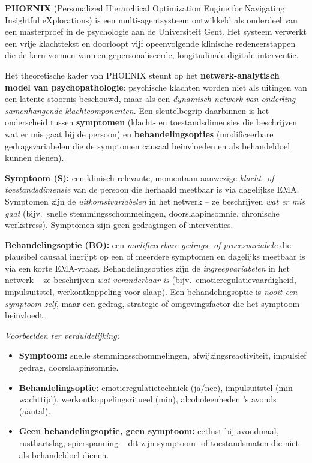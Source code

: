 \documentclass[11pt,a4paper]{article}
\begin{document}
\textbf{PHOENIX} (Personalized Hierarchical Optimization Engine for Navigating
Insightful eXplorations) is een multi-agentsysteem ontwikkeld als onderdeel van
een masterproef in de psychologie aan de Universiteit Gent. Het systeem verwerkt
een vrije klachttekst en doorloopt vijf opeenvolgende klinische redeneerstappen
die de kern vormen van een gepersonaliseerde, longitudinale digitale interventie.

Het theoretische kader van PHOENIX steunt op het \textbf{netwerk-analytisch model
van psychopathologie}: psychische klachten worden niet
als uitingen van een latente stoornis beschouwd, maar als een \emph{dynamisch
netwerk van onderling samenhangende klachtcomponenten}. Een sleutelbegrip daarbinnen
is het onderscheid tussen \textbf{symptomen} (klacht- en toestandsdimensies die
beschrijven wat er mis gaat bij de persoon) en \textbf{behandelingsopties}
(modificeerbare gedragsvariabelen die de symptomen causaal beinvloeden en als
behandeldoel kunnen dienen).

\vspace{0.4em}
\begin{instrbox}[title={Kerndefinities: symptoom versus behandelingsoptie}]
\small
\textbf{Symptoom (S):} een klinisch relevante, momentaan aanwezige
\emph{klacht- of toestandsdimensie} van de persoon die herhaald meetbaar is via
dagelijkse EMA. Symptomen zijn de \emph{uitkomstvariabelen} in het netwerk -- ze
beschrijven \emph{wat er mis gaat} (bijv.\ snelle stemmingsschommelingen, doorslaapinsomnie,
chronische werkstress). Symptomen zijn geen gedragingen of interventies.

\medskip
\textbf{Behandelingsoptie (BO):} een \emph{modificeerbare gedrags- of procesvariabele}
die plausibel causaal ingrijpt op een of meerdere symptomen en dagelijks meetbaar
is via een korte EMA-vraag. Behandelingsopties zijn de \emph{ingreepvariabelen} in het
netwerk -- ze beschrijven \emph{wat veranderbaar is} (bijv.\ emotieregulatievaardigheid,
impulsuitstel, werkontkoppeling voor slaap). Een behandelingsoptie is \emph{nooit een symptoom zelf},
maar een gedrag, strategie of omgevingsfactor die het symptoom beinvloedt.

\medskip\small
\textit{Voorbeelden ter verduidelijking:}
\begin{itemize}[topsep=1pt,itemsep=0pt]
\item \textbf{Symptoom:} snelle stemmingsschommelingen, afwijzingsreactiviteit, impulsief gedrag, doorslaapinsomnie.
\item \textbf{Behandelingsoptie:} emotieregulatietechniek (ja/nee), impulsuitstel (min wachttijd),
werkontkoppelingsritueel (min), alcoholeenheden 's avonds (aantal).
\item \textbf{Geen behandelingsoptie, geen symptoom:} eetlust bij avondmaal, rusthartslag,
spierspanning -- dit zijn symptoom- of toestandsmaten die niet als behandeldoel dienen.
\end{itemize}
\end{instrbox}
\end{document}
